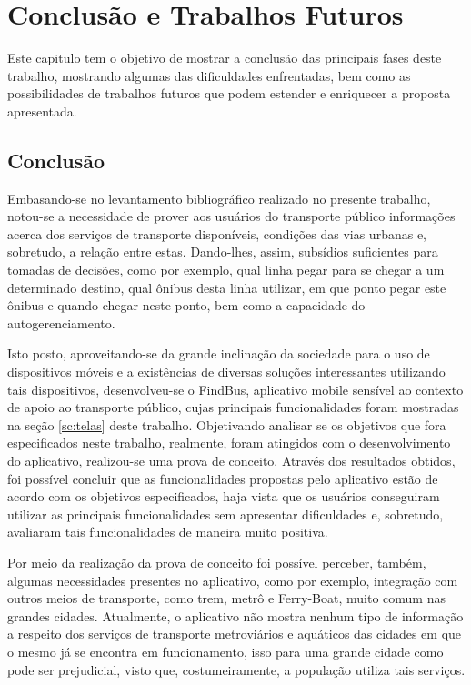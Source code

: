 \chapter{Conclusão e Trabalhos Futuros}
\label{ch:conclusion}

Este capitulo tem o objetivo de mostrar a conclusão das principais fases deste trabalho, mostrando algumas das dificuldades enfrentadas, bem como as possibilidades de trabalhos futuros que podem estender e enriquecer a proposta apresentada.

\section{Conclusão}
\label{sc:conclusao}

Embasando-se no levantamento bibliográfico realizado no presente trabalho, notou-se a necessidade de prover aos usuários do transporte público informações acerca dos serviços de transporte disponíveis, condições das vias urbanas e, sobretudo, a relação entre estas. Dando-lhes, assim, subsídios suficientes para tomadas de decisões, como por exemplo, qual linha pegar para se chegar a um determinado destino, qual ônibus desta linha utilizar, em que ponto pegar este ônibus e quando chegar neste ponto, bem como a capacidade do autogerenciamento.  

Isto posto, aproveitando-se da grande inclinação da sociedade para o uso de dispositivos móveis e a existências de diversas soluções interessantes utilizando tais dispositivos, desenvolveu-se o FindBus, aplicativo mobile sensível ao contexto de apoio ao transporte público, cujas principais funcionalidades foram mostradas na seção \ref{sc:telas} deste trabalho.
Objetivando analisar se os objetivos que fora especificados neste trabalho, realmente, foram atingidos com o desenvolvimento do aplicativo, realizou-se uma prova de conceito. Através dos resultados obtidos, foi possível concluir que as funcionalidades propostas pelo aplicativo estão de acordo com os objetivos especificados, haja vista que os usuários conseguiram utilizar as principais funcionalidades sem apresentar dificuldades e, sobretudo, avaliaram tais funcionalidades de maneira muito positiva. 

Por meio da realização da prova de conceito foi possível perceber, também, algumas necessidades presentes no aplicativo, como por exemplo, integração com outros meios de transporte, como trem, metrô e Ferry-Boat, muito comum nas grandes cidades. Atualmente, o aplicativo não mostra nenhum tipo de informação a respeito dos serviços de transporte metroviários e aquáticos das cidades em que o mesmo já se encontra em funcionamento, isso para uma grande cidade como pode ser prejudicial, visto que, costumeiramente, a população utiliza tais serviços. 

